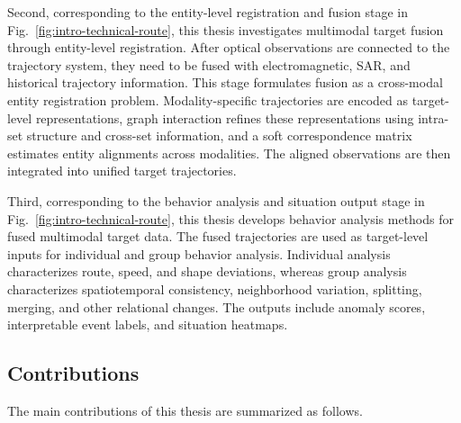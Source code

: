 Second, corresponding to the entity-level registration and fusion stage in Fig.~\ref{fig:intro-technical-route}, this thesis investigates multimodal target fusion through entity-level registration. After optical observations are connected to the trajectory system, they need to be fused with electromagnetic, SAR, and historical trajectory information. This stage formulates fusion as a cross-modal entity registration problem. Modality-specific trajectories are encoded as target-level representations, graph interaction refines these representations using intra-set structure and cross-set information, and a soft correspondence matrix estimates entity alignments across modalities. The aligned observations are then integrated into unified target trajectories.

Third, corresponding to the behavior analysis and situation output stage in Fig.~\ref{fig:intro-technical-route}, this thesis develops behavior analysis methods for fused multimodal target data. The fused trajectories are used as target-level inputs for individual and group behavior analysis. Individual analysis characterizes route, speed, and shape deviations, whereas group analysis characterizes spatiotemporal consistency, neighborhood variation, splitting, merging, and other relational changes. The outputs include anomaly scores, interpretable event labels, and situation heatmaps.

\subsection{Contributions}
The main contributions of this thesis are summarized as follows.

